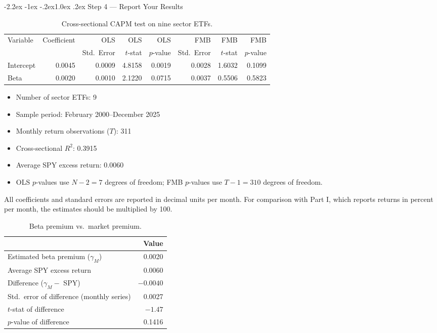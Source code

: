 \documentclass[11pt]{article}
\makeatletter
\renewcommand\subsection{\@startsection{subsection}{2}{0pt}%
  {-2.2ex \@plus -1ex \@minus -.2ex}{1.0ex \@plus .2ex}%
  {\normalfont\bfseries\normalsize\color{psink}}}
\newenvironment{tight}
  {\begin{itemize}\setlength{\itemsep}{3pt}\setlength{\parskip}{0pt}%
   \setlength{\topsep}{3pt}\setlength{\leftmargini}{1.4em}}
  {\end{itemize}}
\makeatother
\begin{document}
\subsection{Step 4 --- Report Your Results}

\begin{table}[H]
\centering
\caption{Cross-sectional CAPM test on nine sector ETFs.}
\small
\begin{tabular}{lrrrrrrr}
\toprule
Variable & Coefficient & OLS & OLS & OLS & FMB & FMB & FMB \\
 & & Std.\ Error & $t$-stat & $p$-value & Std.\ Error & $t$-stat & $p$-value \\
\midrule
Intercept & 0.0045 & 0.0009 & 4.8158 & 0.0019 & 0.0028 & 1.6032 & 0.1099 \\
Beta      & 0.0020 & 0.0010 & 2.1220 & 0.0715 & 0.0037 & 0.5506 & 0.5823 \\
\bottomrule
\end{tabular}
\label{tab:cap}
\end{table}

\begin{tight}
\item Number of sector ETFs: 9
\item Sample period: February 2000--December 2025
\item Monthly return observations ($T$): 311
\item Cross-sectional $R^2$: 0.3915
\item Average SPY excess return: 0.0060
\item OLS $p$-values use $N - 2 = 7$ degrees of freedom; FMB $p$-values use
$T - 1 = 310$ degrees of freedom.
\end{tight}

All coefficients and standard errors are reported in decimal units per month.
For comparison with Part I, which reports returns in percent per month, the
estimates should be multiplied by 100.

\begin{table}[H]
\centering
\caption{Beta premium vs.\ market premium.}
\small
\begin{tabular}{lr}
\toprule
& Value \\
\midrule
Estimated beta premium ($\gamma_M$) & 0.0020 \\
Average SPY excess return & 0.0060 \\
Difference ($\gamma_M -$ SPY) & $-0.0040$ \\
Std.\ error of difference (monthly series) & 0.0027 \\
$t$-stat of difference & $-1.47$ \\
$p$-value of difference & 0.1416 \\
\bottomrule
\end{tabular}
\label{tab:capdiff}
\end{table}
\end{document}
